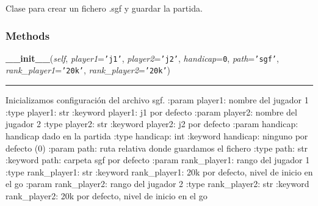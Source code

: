     \label{src:kifu:Kifu}
Clase para crear un fichero .sgf y guardar la partida.



  \subsubsection{Methods}

    \label{src:kifu:Kifu:__init__}

    \vspace{0.5ex}

\hspace{.8\funcindent}\begin{boxedminipage}{\funcwidth}

    \raggedright \textbf{\_\_init\_\_}(\textit{self}, \textit{player1}={\tt \texttt{'}\texttt{j1}\texttt{'}}, \textit{player2}={\tt \texttt{'}\texttt{j2}\texttt{'}}, \textit{handicap}={\tt 0}, \textit{path}={\tt \texttt{'}\texttt{sgf}\texttt{'}}, \textit{rank\_player1}={\tt \texttt{'}\texttt{20k}\texttt{'}}, \textit{rank\_player2}={\tt \texttt{'}\texttt{20k}\texttt{'}})

    \vspace{-1.5ex}

    \rule{\textwidth}{0.5\fboxrule}
\setlength{\parskip}{2ex}
    Inicializamos configuración del archivo sgf. :param  player1: nombre 
    del jugador 1 :type  player1: str :keyword  player1: j1 por defecto 
    :param  player2: nombre del jugador 2 :type  player2: str :keyword  
    player2: j2 por defecto :param  handicap: handicap dado en la partida 
    :type  handicap: int :keyword  handicap: ninguno por defecto (0) :param
    path: ruta relativa donde guardamos el fichero :type  path: str 
    :keyword  path: carpeta sgf por defecto :param  rank\_player1: rango 
    del jugador 1 :type  rank\_player1: str :keyword  rank\_player1: 20k 
    por defecto, nivel de inicio en el go :param  rank\_player2: rango del 
    jugador 2 :type  rank\_player2: str :keyword  rank\_player2: 20k por 
    defecto, nivel de inicio en el go

\setlength{\parskip}{1ex}
    \end{boxedminipage}

